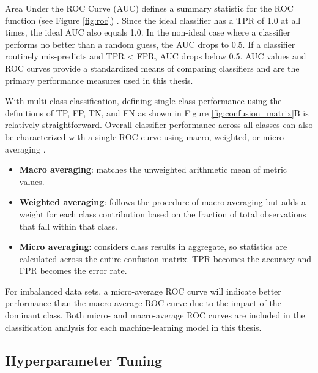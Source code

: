 Area Under the ROC Curve (AUC) defines a summary statistic for the ROC function (see Figure \ref{fig:roc}) \citep{fawcett_introduction_2006}. Since the ideal classifier has a TPR of 1.0 at all times, the ideal AUC also equals 1.0. In the non-ideal case where a classifier performs no better than a random guess, the AUC drops to 0.5. If a classifier routinely mis-predicts and TPR < FPR, AUC drops below 0.5. AUC values and ROC curves provide a standardized means of comparing classifiers and are the primary performance measures used in this thesis.

With multi-class classification, defining single-class performance using the definitions of TP, FP, TN, and FN as shown in Figure \ref{fig:confusion_matrix}B is relatively straightforward. Overall classifier performance across all classes can also be characterized with a single ROC curve using macro, weighted, or micro averaging \citep{scikit-learn_sklearnmetricsroc_auc_score_2021}.

\begin{itemize}[itemsep=2pt]
    \item \textbf{Macro averaging}: matches the unweighted arithmetic mean of metric values.
    \item \textbf{Weighted averaging}: follows the procedure of macro averaging but adds a weight for each class contribution based on the fraction of total observations that fall within that class. 
    \item \textbf{Micro averaging}: considers class results in aggregate, so statistics are calculated across the entire confusion matrix. TPR becomes the accuracy and FPR becomes the error rate.
\end{itemize}

For imbalanced data sets, a micro-average ROC curve will indicate better performance than the macro-average ROC curve due to the impact of the dominant class. Both micro- and macro-average ROC curves are included in the classification analysis for each machine-learning model in this thesis.

\subsection{Hyperparameter Tuning}\label{ch3:strat_kfold_cv}


